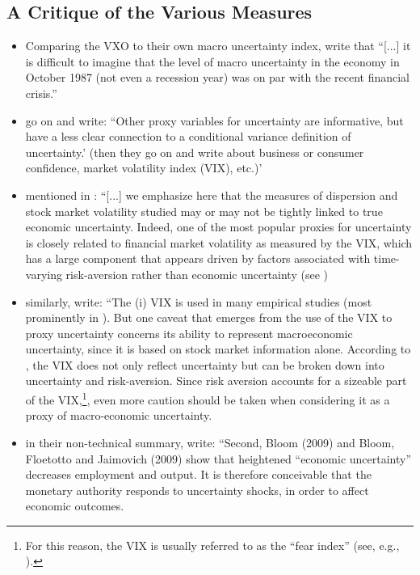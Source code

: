 \documentclass[a4paper,12pt,oneside,pointednumbers,bibtotoc,bigheadings,liststotoc]{scrbook}
\begin{document}
\subsection{A Critique of the Various Measures}
\begin{itemize}
	\item Comparing the VXO to their own macro uncertainty index, \citet[p. 1201]{juradoetal:15} write that ``[...] it is difficult to imagine that the level of macro uncertainty in the economy in October 1987 (not even a recession year) was on par with the recent financial crisis.''
	\item \citet{orlikandveldkamp:14} go on and write: ``Other proxy variables for uncertainty are informative, but have a less clear connection to a conditional variance definition of uncertainty.' (then they go on and write about business or consumer confidence, market volatility index (VIX), etc.)'
	\item mentioned in \citet[p. 1182]{juradoetal:15}: ``[...] we emphasize here that the measures of dispersion and stock market volatility studied may or may not be tightly linked to true economic uncertainty. Indeed, one of the most popular proxies for uncertainty is closely related to financial market volatility as measured by the VIX, which has a large component that appears driven by factors associated with time-varying risk-aversion rather than economic uncertainty (see \citet{bekaertetal:13}) 
	\item similarly, \citet[p. 12]{bontempietal:16} write: ``The (i) VIX is used in many empirical studies (most prominently in \citet{bloom:09}). But one caveat that emerges from the use of the VIX to proxy uncertainty concerns its ability to represent macroeconomic uncertainty, since it is based on stock market information alone. According to \citet{bekaertetal:13}, the VIX does not only reflect uncertainty but can be broken down into uncertainty and risk-aversion. Since risk aversion accounts for a sizeable part of the VIX,\footnote{For this reason, the VIX is usually referred to as the ``fear index'' (see, e.g., \citet{whaley:00}).}, even more caution should be taken when considering it as a proxy of macro-economic uncertainty.
	\item in their non-technical summary, \citet{bekaertetal:13} write: ``Second, Bloom (2009) and Bloom, Floetotto and Jaimovich (2009) show that heightened
“economic uncertainty” decreases employment and output. It is therefore conceivable that the
monetary authority responds to uncertainty shocks, in order to affect economic outcomes.

\end{itemize}
\end{document}
